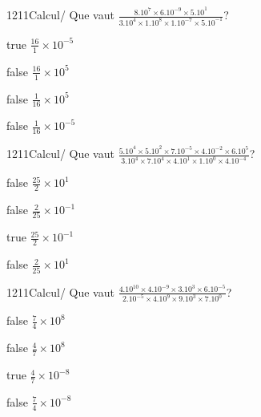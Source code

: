 \documentclass[11pt]{article}
\begin{document}
            \begin{question}{1211}{Calcul}{}{/}
                Que vaut $\frac{8.10^{7}\times 6.10^{-9}\times 5.10^{1}}{3.10^{4}\times 1.10^{8}\times 1.10^{-7}\times 5.10^{-1}}$?
            \end{question}
            
            \begin{reponses}
                \item[true] $\frac{16}{1}\times 10^{-5}$
                \item[false] $\frac{16}{1}\times 10^{5}$
                \item[false] $\frac{1}{16}\times 10^{5}$
                \item[false] $\frac{1}{16}\times 10^{-5}$
            \end{reponses}
            
            \begin{question}{1211}{Calcul}{}{/}
                Que vaut $\frac{5.10^{4}\times 5.10^{2}\times 7.10^{-5}\times 4.10^{-2}\times 6.10^{5}}{3.10^{4}\times 7.10^{4}\times 4.10^{1}\times 1.10^{0}\times 4.10^{-4}}$?
            \end{question}
            
            \begin{reponses}
                \item[false] $\frac{25}{2}\times 10^{1}$
                \item[false] $\frac{2}{25}\times 10^{-1}$
                \item[true] $\frac{25}{2}\times 10^{-1}$
                \item[false] $\frac{2}{25}\times 10^{1}$
            \end{reponses}
            
            \begin{question}{1211}{Calcul}{}{/}
                Que vaut $\frac{4.10^{10}\times 4.10^{-9}\times 3.10^{3}\times 6.10^{-5}}{2.10^{-5}\times 4.10^{9}\times 9.10^{3}\times 7.10^{0}}$?
            \end{question}
            
            \begin{reponses}
                \item[false] $\frac{7}{4}\times 10^{8}$
                \item[false] $\frac{4}{7}\times 10^{8}$
                \item[true] $\frac{4}{7}\times 10^{-8}$
                \item[false] $\frac{7}{4}\times 10^{-8}$
            \end{reponses}
            
\end{document}
